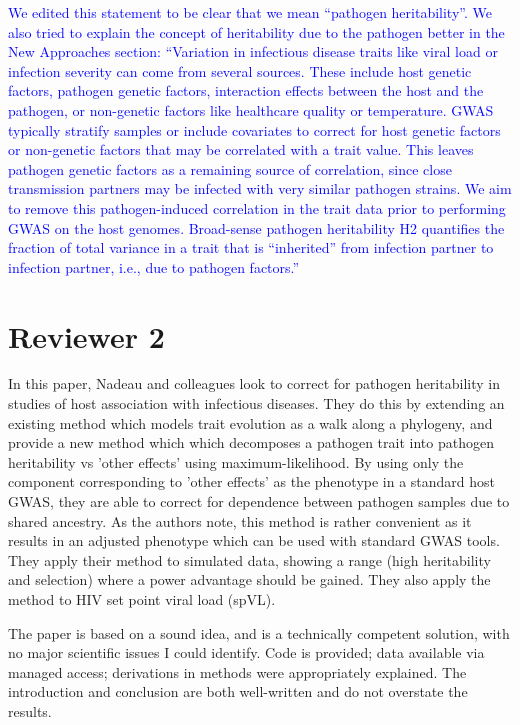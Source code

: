 \documentclass[11pt]{article}
\begin{document}
\begin{enumerate}
    \textcolor{blue}{We edited this statement to be clear that we mean ``pathogen heritability''. We also tried to explain the concept of heritability due to the pathogen better in the New Approaches section: ``Variation in infectious disease traits like viral load or infection severity can come from several sources. These include host genetic factors, pathogen genetic factors, interaction effects between the host and the pathogen, or non-genetic factors like healthcare quality or temperature. GWAS typically stratify samples or include covariates to correct for host genetic factors or non-genetic factors that may be correlated with a trait value. This leaves pathogen genetic factors as a remaining source of correlation, since close transmission partners may be infected with very similar pathogen strains. We aim to remove this pathogen-induced correlation in the trait data prior to performing GWAS on the host genomes. Broad-sense pathogen heritability H2 quantifies the fraction of total variance in a trait that is “inherited” from infection partner to infection partner, i.e., due to pathogen factors.''}
\end{enumerate}

\section*{Reviewer 2}

In this paper, Nadeau and colleagues look to correct for pathogen heritability in studies of host association with infectious diseases. They do this by extending an existing method which models trait evolution as a walk along a phylogeny, and provide a new method which which decomposes a pathogen trait into pathogen heritability vs 'other effects' using maximum-likelihood. By using only the component corresponding to 'other effects' as the phenotype in a standard host GWAS, they are able to correct for dependence between pathogen samples due to shared ancestry. As the authors note, this method is rather convenient as it results in an adjusted phenotype which can be used with standard GWAS tools. They apply their method to simulated data, showing a range (high heritability and selection) where a power advantage should be gained. They also apply the method to HIV set point viral load (spVL).

The paper is based on a sound idea, and is a technically competent solution, with no major scientific issues I could identify. Code is provided; data available via managed access; derivations in methods were appropriately explained. The introduction and conclusion are both well-written and do not overstate the results.
\end{document}

